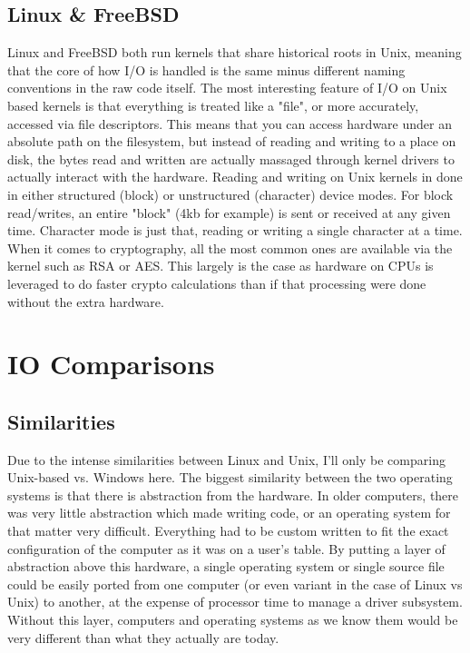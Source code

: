 \subsection{Linux \& FreeBSD}
Linux and FreeBSD both run kernels that share historical roots in Unix, meaning that the core of how I/O is handled is the same minus different naming conventions in the raw code itself. The most interesting feature of I/O on Unix based kernels is that everything is treated like a "file", or more accurately, accessed via file descriptors. This means that you can access hardware under an absolute path on the filesystem, but instead of reading and writing to a place on disk, the bytes read and written are actually massaged through kernel drivers to actually interact with the hardware. Reading and writing on Unix kernels in done in either structured (block) or unstructured (character) device modes. For block read/writes, an entire "block" (4kb for example) is sent or received at any given time. Character mode is just that, reading or writing a single character at a time. When it comes to cryptography, all the most common ones are available via the kernel such as RSA or AES. This largely is the case as hardware on CPUs is leveraged to do faster crypto calculations than if that processing were done without the extra hardware.


\section{IO Comparisons}
\subsection{Similarities}
Due to the intense similarities between Linux and Unix, I'll only be comparing Unix-based vs. Windows here. The biggest similarity between the two operating systems is that there is abstraction from the hardware. In older computers, there was very little abstraction which made writing code, or an operating system for that matter very difficult. Everything had to be custom written to fit the exact configuration of the computer as it was on a user's table. By putting a layer of abstraction above this hardware, a single operating system or single source file could be easily ported from one computer (or even variant in the case of Linux vs Unix) to another, at the expense of processor time to manage a driver subsystem. Without this layer, computers and operating systems as we know them would be very different than what they actually are today. 

